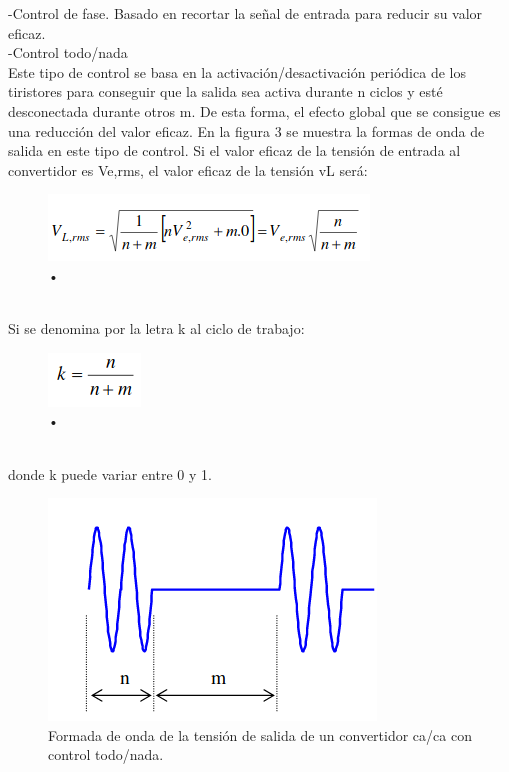 \documentclass[10pt,a4paper]{article}
\begin{document}
-Control de fase. Basado en recortar la señal de entrada para reducir su valor eficaz.\\
-Control todo/nada\\
Este tipo de control se basa en la activación/desactivación periódica de los tiristores para conseguir que la  salida  sea  activa  durante  n  ciclos  y  esté  desconectada  durante  otros  m.  De  esta  forma,  el  efecto global que se consigue es una reducción del valor eficaz. En la figura 3 se muestra la formas de onda de salida en este tipo de control. Si el valor eficaz de la tensión de entrada al convertidor es Ve,rms, el valor eficaz de la tensión vL será:\\
\begin{figure}[hbtp]
\caption{•}
\centering
\includegraphics[scale=0.4]{ec.png}
\end{figure}\\
Si se denomina por la letra k al ciclo de trabajo:\\
\begin{figure}[hbtp]
 \caption{•}
 \centering
 \includegraphics[scale=0.4]{ecc.png}
 \end{figure}\\
donde k puede variar entre 0 y 1. \\\begin{figure}[hbtp]
\centering
\includegraphics[scale=0.4]{ondaa.png}
\caption{Formada de onda de la tensión de salida de un convertidor ca/ca con control todo/nada. }
\end{figure}\\
\end{document}
